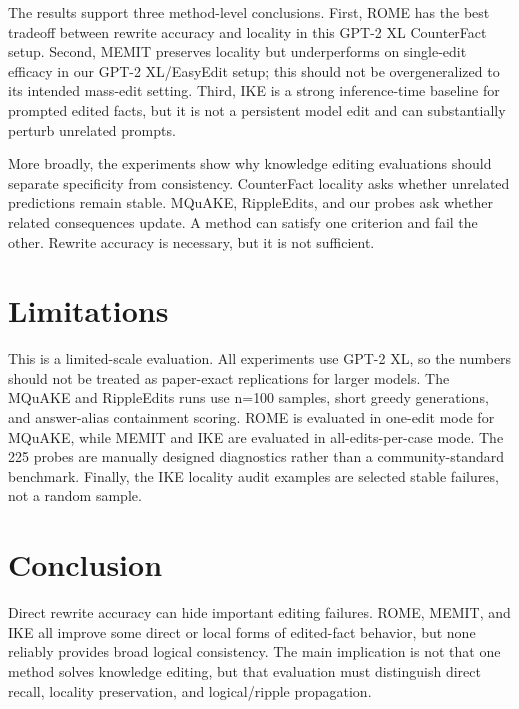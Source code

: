 \documentclass[11pt]{article}
\begin{document}
The results support three method-level conclusions. First, ROME has the best tradeoff between rewrite accuracy and locality in this GPT-2 XL CounterFact setup. Second, MEMIT preserves locality but underperforms on single-edit efficacy in our GPT-2 XL/EasyEdit setup; this should not be overgeneralized to its intended mass-edit setting. Third, IKE is a strong inference-time baseline for prompted edited facts, but it is not a persistent model edit and can substantially perturb unrelated prompts.

More broadly, the experiments show why knowledge editing evaluations should separate specificity from consistency. CounterFact locality asks whether unrelated predictions remain stable. MQuAKE, RippleEdits, and our probes ask whether related consequences update. A method can satisfy one criterion and fail the other. Rewrite accuracy is necessary, but it is not sufficient.

\section{Limitations}

This is a limited-scale evaluation. All experiments use GPT-2 XL, so the numbers should not be treated as paper-exact replications for larger models. The MQuAKE and RippleEdits runs use n=100 samples, short greedy generations, and answer-alias containment scoring. ROME is evaluated in one-edit mode for MQuAKE, while MEMIT and IKE are evaluated in all-edits-per-case mode. The 225 probes are manually designed diagnostics rather than a community-standard benchmark. Finally, the IKE locality audit examples are selected stable failures, not a random sample.

\section{Conclusion}

Direct rewrite accuracy can hide important editing failures. ROME, MEMIT, and IKE all improve some direct or local forms of edited-fact behavior, but none reliably provides broad logical consistency. The main implication is not that one method solves knowledge editing, but that evaluation must distinguish direct recall, locality preservation, and logical/ripple propagation.
\end{document}

